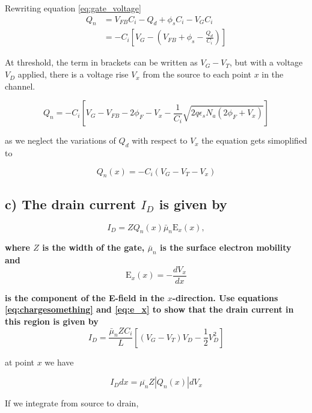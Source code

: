 Rewriting equation \ref*{eq:gate_voltage}
\begin{align}
    Q_n&=V_{FB} C_i -Q_d + \phi_s C_i-V_GC_i\\
    &=-C_i\left[V_G-\left(V_{FB}+\phi_s-\frac{Q_d}{C_i}\right)\right]
\end{align}

At threshold, the term in brackets can be written as $V_G-V_T$, but with a voltage $V_D$ applied, there is a voltage rise $V_x$ from the source to each point $x$ in the channel.

\begin{equation}
    Q_n=-C_i\left[V_G-V_{F B}-2 \phi_F-V_x-\frac{1}{C_i} \sqrt{2 q \epsilon_s N_a\left(2 \phi_F+V_x\right)}\right]
    \label{eq:q_n}
\end{equation}

as we neglect the variations of $Q_d$ with respect to $V_x$ the equation gets simoplified to 

\begin{equation}
    Q_n(x)=-C_i\left(V_G-V_T-V_x\right)
\end{equation}

\subsection*{c) The drain current $I_D$ is given by}
\begin{equation}
    I_D=Z Q_n(x) \bar{\mu}_n \mathrm{E}_x(x),
    \label{eq:drain_current}    
\end{equation}

\textbf{where $Z$ is the width of the gate, $\bar{\mu}_n$ is the surface electron mobility and} 
\begin{equation}
    \mathrm{E}_x(x)=-\frac{d V_x}{d x}
    \label{eq:e_x}    
\end{equation}

\textbf{is the component of the E-field in the $x$-direction. Use equations \ref*{eq:chargesomething} and \ref*{eq:e_x} to show that the drain current in this region is given by}
$$
I_D=\frac{\bar{\mu}_n Z C_i}{L}\left[\left(V_G-V_T\right) V_D-\frac{1}{2} V_D^2\right]
$$

at point $x$ we have

\begin{equation}
    I_D dx=\overline{\mu_n}Z|Q_n(x)|dV_x
    \label{eq:idx}
\end{equation}

If we integrate from source to drain,

